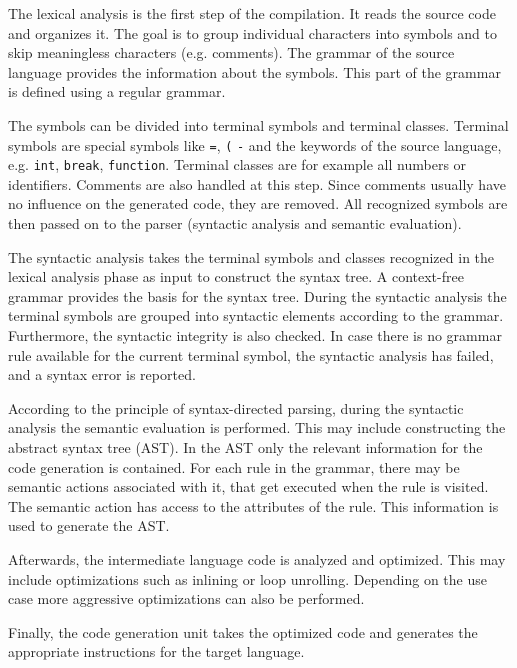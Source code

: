 The lexical analysis is the first step of the compilation. It reads the source code and organizes it. The goal is to group individual characters into symbols and to skip meaningless characters (e.g. comments). The grammar of the source language provides the information about the symbols. This part of the grammar is defined using a regular grammar. 

The symbols can be divided into terminal symbols and terminal classes. Terminal symbols are special symbols like \texttt{=}, \texttt{(} \texttt{-} and the keywords of the source language, e.g. \texttt{int}, \texttt{break},  \texttt{function}. Terminal classes are for example all numbers or identifiers. Comments are also handled at this step. Since comments usually have no influence on the generated code, they are removed. All recognized symbols are then passed on to the parser (syntactic analysis and semantic evaluation). 



The syntactic analysis takes the terminal symbols and classes recognized in the lexical analysis phase as input to construct the syntax tree. A context-free grammar provides the basis for the syntax tree. During the syntactic analysis the terminal symbols are grouped into syntactic elements according to the grammar. Furthermore, the syntactic integrity is also checked. In case there is no grammar rule available for the current terminal symbol, the syntactic analysis has failed, and a syntax error is reported.


According to the principle of syntax-directed parsing, during the syntactic analysis the semantic evaluation is performed. This may include constructing the abstract syntax tree (AST). In the AST only the relevant information for the code generation is contained. For each rule in the grammar, there may be semantic actions associated with it, that get executed when the rule is visited. The semantic action has access to the attributes of the rule. This information is used to generate the AST.  


Afterwards, the intermediate language code is analyzed and optimized. This may include optimizations such as inlining or loop unrolling. Depending on the use case more aggressive optimizations can also be performed. 

Finally, the code generation unit takes the optimized code and generates the appropriate instructions for the target language. 
